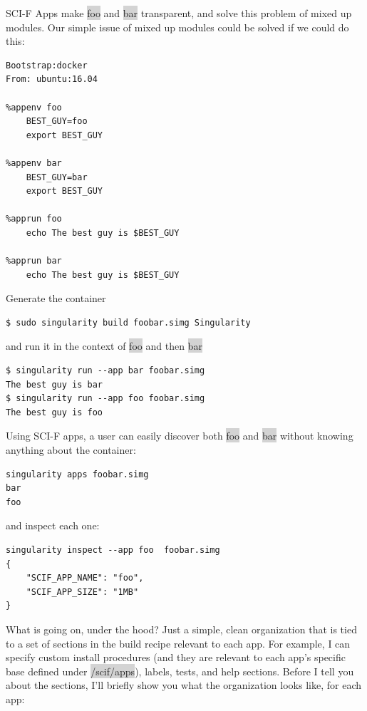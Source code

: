 \documentclass[a4paper]{article}
\newcounter{subsubsubsection}[subsubsection]
\begin{document}
	SCI-F Apps make \colorbox{lightgray}{foo} and \colorbox{lightgray}{bar} transparent, and solve this problem of mixed up modules. Our simple issue of mixed up modules could be solved if we could do this:
	
\begin{lstlisting}[frame=single] 
Bootstrap:docker
From: ubuntu:16.04

%appenv foo
    BEST_GUY=foo
    export BEST_GUY

%appenv bar
    BEST_GUY=bar
    export BEST_GUY

%apprun foo
    echo The best guy is $BEST_GUY

%apprun bar
    echo The best guy is $BEST_GUY
\end{lstlisting}	

Generate the container

\begin{lstlisting}[frame=single]  
$ sudo singularity build foobar.simg Singularity
\end{lstlisting}

and run it in the context of \colorbox{lightgray}{foo} and then \colorbox{lightgray}{bar} 

\begin{lstlisting}[frame=single] 
$ singularity run --app bar foobar.simg
The best guy is bar
$ singularity run --app foo foobar.simg 
The best guy is foo 
\end{lstlisting}

Using SCI-F apps, a user can easily discover both \colorbox{lightgray}{foo} and \colorbox{lightgray}{bar} without knowing anything about the container:

\begin{lstlisting}[frame=single] 
singularity apps foobar.simg
bar
foo 
\end{lstlisting}

and inspect each one:\\[0.1in]	

\begin{lstlisting}[frame=single]
singularity inspect --app foo  foobar.simg 
{
    "SCIF_APP_NAME": "foo",
    "SCIF_APP_SIZE": "1MB"
}  
\end{lstlisting}
		What is going on, under the hood? Just a simple, clean organization that is tied to a set of sections in the build recipe relevant to each app. For example, I can specify custom install procedures (and they are relevant to each app’s specific base defined under \colorbox{lightgray}{/scif/apps}), labels, tests, and help sections. Before I tell you about the sections, I’ll briefly show you what the organization looks like, for each app:
		
\end{document}
